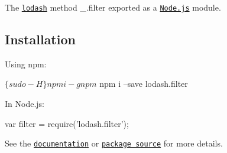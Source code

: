The \href{https://lodash.com/}{\tt lodash} method {\ttfamily \+\_\+.\+filter} exported as a \href{https://nodejs.org/}{\tt Node.\+js} module.

\subsection*{Installation}

Using npm\+: 
\begin{DoxyCode}
$ \{sudo -H\} npm i -g npm
$ npm i --save lodash.filter
\end{DoxyCode}


In Node.\+js\+: 
\begin{DoxyCode}
var filter = require('lodash.filter');
\end{DoxyCode}


See the \href{https://lodash.com/docs#filter}{\tt documentation} or \href{https://github.com/lodash/lodash/blob/4.6.0-npm-packages/lodash.filter}{\tt package source} for more details. 